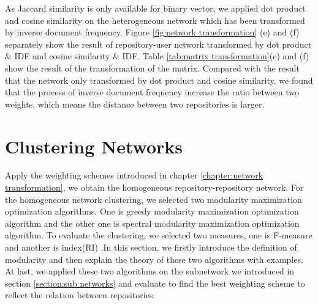 \documentclass[12pt,oneside,final]{vlsithesis}
\begin{document}
As Jaccard similarity is only available for binary vector, we applied dot product and cosine similarity on the heterogeneous network which has been transformed by inverse document frequency. Figure \ref{fig:network transformation} (e) and (f) separately show the result of repository-user network transformed by dot product \& IDF and cosine similarity \& IDF.  Table \ref{tab:matrix transformation}(e) and (f) show the result of the transformation of the matrix. Compared with the result that the network only transformed by dot product and cosine similarity, we found that the process of inverse document frequency increase the ratio between two weights, which means the distance between two repositories is larger. 
\chapter{Clustering Networks}\label{chapter:Clustering Networks}
Apply the weighting schemes introduced in chapter \ref{chapter:network transformation}, we obtain the homogeneous repository-repository network. For the homogeneous network clustering, we selected two modularity maximization optimization algorithms. One is greedy modularity maximization optimization algorithm \cite{newman2004fast} and the other one is spectral modularity maximization optimization algorithm\cite{newman2006modularity}. To evaluate the clustering, we selected two measures, one is  F-measure \cite{wagner2007comparing} and another is index(RI) \cite{rand1971objective}.In this section, we firstly introduce the definition of modularity and then explain the theory of these two algorithms with examples. At last, we applied these two algorithms on the subnetwork we introduced in section \ref{section:sub networks} and evaluate to find the best weighting scheme to reflect the relation between repositories. 
\end{document}
